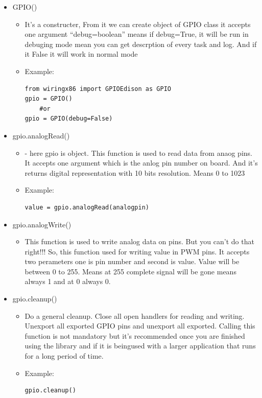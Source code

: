 \documentclass[11pt,a4paper]{article}
\begin{document}
\begin{itemize}
\item	GPIO()
\begin{itemize}
\item	It’s a constructer, From it we can create object of GPIO class it accepts one argument “debug=boolean” means if debug=True, it will be run in debuging mode mean you can get descrption of every task and log. And if it False it will work in normal mode
\item Example:
\begin{lstlisting}
from wiringx86 import GPIOEdison as GPIO
gpio = GPIO()
	#or
gpio = GPIO(debug=False)
\end{lstlisting}

\end{itemize}
\item	gpio.analogRead()
\begin{itemize}
\item	-	here gpio is object. This function is used to read data from anaog pins. It accepts one argument which is the anlog pin number on board. And it’s returns digital representation with 10 bits resolution. Means 0 to 1023
\item Example:
\begin{lstlisting}
value = gpio.analogRead(analogpin) 
\end{lstlisting}

\end{itemize}
\item 	gpio.analogWrite()
\begin{itemize}
\item	This function is used to write analog data on pins. But you can’t do that right!!! So, this function used for writing value in PWM pins. It accepts two perameters one is pin number and second is value. Value will be between 0 to 255. Means at 255 complete signal will be gone means always 1 and at 0 always 0.


\end{itemize}
\item	gpio.cleanup()
\begin{itemize}
\item	Do a general cleanup. Close all open handlers for reading and writing. Unexport all exported GPIO pins and unexport all exported. Calling this function is not mandatory but it’s recommended once you are finished using the library and if it is beingused with a larger application that runs for a long period of time. 
\item Example:
\begin{lstlisting}
gpio.cleanup() 
\end{lstlisting}


\end{itemize}
\end{itemize}
\end{document}
